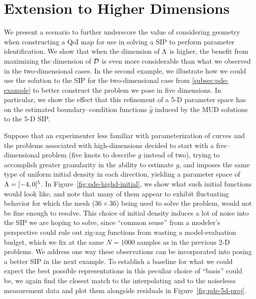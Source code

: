 \section{Extension to Higher Dimensions}\label{sec:mud-higher-dimensions}
We present a scenario to further underscore the value of considering geometry when constructing a QoI map for use in solving a SIP to perform parameter identification.
We show that when the dimension of ${\Lambda}$ is higher, the benefit from maximizing the dimension of $\mathcal{D}$ is even more considerable than what we observed in the two-dimensional cases.
In the second example, we illustrate how we could use the solution to the SIP for the two-dimensional case from \ref{subsec:pde-example} to better construct the problem we pose in five dimensions.
In particular, we show the effect that this refinement of a 5-D parameter space has on the estimated boundary--condition functions $\widehat{g}$ induced by the MUD solutions to the 5-D SIP.

Suppose that an experimenter less familiar with parameterization of curves and the problems associated with high-dimensions decided to start with a five--dimensional problem (five knots to describe $g$ instead of two), trying to accomplish greater granularity in the ability to estimate $g$, and imposes the same type of uniform initial density in each direction, yielding a parameter space of ${\Lambda} = [-4, 0]^5$.
In Figure~\ref{fig:pde-highd-initial}, we show what such initial functions would look like, and note that many of them appear to exhibit fluctuating behavior for which the mesh ($36\times36$) being used to solve the problem, would not be fine enough to resolve.
This choice of initial density induces a lot of noise into the SIP we are hoping to solve, since ``common sense'' from a modeler's perspective could rule out zig-zag functions from wasting a model-evaluation budget, which we fix at the same $N=1000$ samples as in the previous 2-D problems.
We address one way these observations can be incorporated into posing a better SIP in the next example.
To establish a baseline for what we could expect the best possible representations in this peculiar choice of ``basis'' could be, we again find the closest match to the interpolating and to the noiselesss measurement data and plot them alongside residuals in Figure~\ref{fig:pde-5d-proj}.


